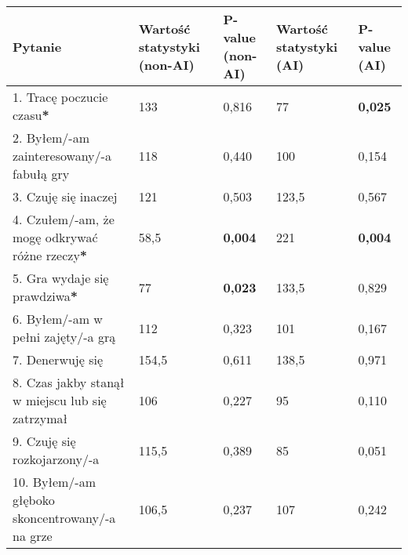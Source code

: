 \begin{table}[h!]
    \begin{center}
        \begin{tabular}{|m{10em}|m{5em}|m{5em}|m{5em}|m{5em}|}
            \hline
            Pytanie                                                           & Wartość statystyki (non-AI) & P-value (non-AI) & Wartość statystyki (AI) & P-value (AI)   \\
            \hline
            1. Tracę poczucie czasu\textbf{*}                                 & 133                         & 0,816            & 77                      & \textbf{0,025} \\
            2. Byłem/-am \newline zainteresowany/-a fabułą gry                & 118                         & 0,440            & 100                     & 0,154          \\
            3. Czuję się inaczej                                              & 121                         & 0,503            & 123,5                   & 0,567          \\
            4. Czułem/-am, że mogę odkrywać różne rzeczy\textbf{*}            & 58,5                        & \textbf{0,004}   & 221                     & \textbf{0,004} \\
            5. Gra wydaje się prawdziwa\textbf{*}                             & 77                          & \textbf{0,023}   & 133,5                   & 0,829          \\
            6. Byłem/-am \newline w pełni zajęty/-a grą                       & 112                         & 0,323            & 101                     & 0,167          \\
            7. Denerwuję się                                                  & 154,5                       & 0,611            & 138,5                   & 0,971          \\
            8. Czas jakby stanął w miejscu lub się zatrzymał                  & 106                         & 0,227            & 95                      & 0,110          \\
            9. Czuję się \newline rozkojarzony/-a                             & 115,5                       & 0,389            & 85                      & 0,051          \\
            10. Byłem/-am głęboko \newline skoncentrowany/-a \newline na grze & 106,5                       & 0,237            & 107                     & 0,242          \\

\end{tabular}
\end{center}
\end{table}
